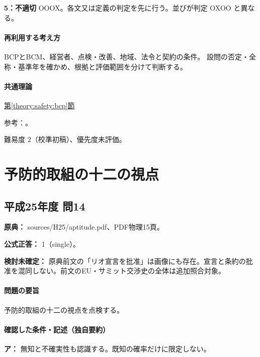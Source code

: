 \noindent\textbf{5：不適切} OOOX。各文又は定義の判定を先に行う。並びが判定 OXOO と異なる。\par

\paragraph{再利用する考え方} BCPとBCM、経営者、点検・改善、地域、法令と契約の条件。 設問の否定・全称・基準年を確かめ、根拠と評価範囲を分けて判断する。

\paragraph{共通理論} \hyperref[theory:safety:bcp]{第\ref*{theory:safety:bcp}節}

\par 参考：\cite{eth54_bcp2021}。

\par 難易度 2（校準初稿）、優先度未評価。

\section{予防的取組の十二の視点}

\subsection{平成25年度 問14}
\label{q:h25-reg-apt-14}

\noindent\textbf{原典：} sources/H25/aptitude.pdf、PDF物理15頁。

\textbf{公式正答：} 1（single）。

\par\textbf{検討未確定：} 原典前文の「リオ宣言を批准」は画像にも存在。宣言と条約の批准を混同しない。前文のEU・サミット交渉史の全体は追加照合対象。

\paragraph{問題の要旨} 予防的取組の十二の視点を点検する。

\paragraph{確認した条件・記述（独自要約）}\mbox{}\par

\noindent\textbf{ア：} 無知と不確実性も認識する。既知の確率だけに限定しない。\par

